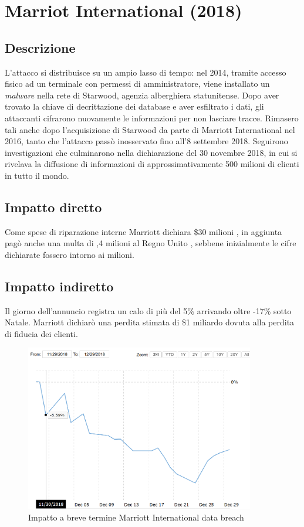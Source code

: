 \documentclass[12pt,a4paper,openright,twoside]{report}
\begin{document}
\section{Marriot International (2018)}
\subsection{Descrizione}
L'attacco si distribuisce su un ampio lasso di tempo: nel 2014, tramite accesso fisico ad un terminale con permessi di amministratore, viene installato un \textit{malware} nella rete di Starwood, agenzia alberghiera statunitense. Dopo aver trovato la chiave di decrittazione dei database e aver esfiltrato i dati, gli attaccanti cifrarono nuovamente le informazioni per non lasciare tracce. Rimasero tali anche dopo l'acquisizione di Starwood da parte di Marriott International nel 2016, tanto che l'attacco pass\`o  inosservato fino all'8 settembre 2018. Seguirono investigazioni che culminarono nella dichiarazione del 30 novembre 2018, in cui si rivelava la diffusione di informazioni di approssimativamente 500 milioni di clienti in tutto il mondo\cite{Marriott_ResGate}\cite{Marriott_customer_perception}.\\ 
\subsection{Impatto diretto}
Come spese di riparazione interne Marriott dichiara \$30 milioni \cite{Marriott_ResGate}, in aggiunta pag\`o anche una multa di ,4 milioni al Regno Unito \cite{Marriott_actual_fine}, sebbene  inizialmente le cifre dichiarate fossero intorno ai  milioni.\\ 
\subsection{Impatto indiretto}
Il giorno dell'annuncio registra un calo di pi\`u del 5\% arrivando oltre  -17\% sotto Natale. Marriott dichiar\`o una perdita stimata di \$1 miliardo dovuta alla perdita di fiducia dei clienti\cite{Marriott_ResGate}.\\

\begin{figure}[H] 
\begin{center} 
\includegraphics[width=10cm]{figures/marriott_short.png} 
\caption[Grafico Marriott short]{Impatto a breve termine Marriott International data breach}\label{fig:mrt1}
\end{center}
\end{figure}
\end{document}
